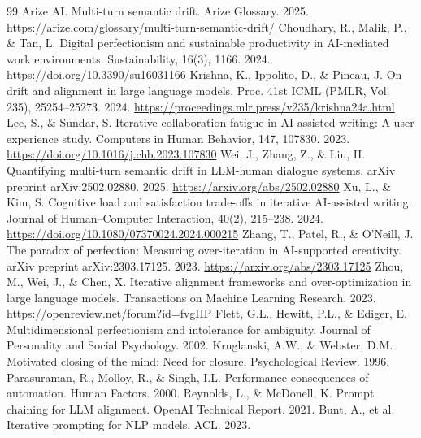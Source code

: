 \documentclass[conference]{IEEEtran} %
\begin{document}
\begin{thebibliography}{99}
 Arize AI. Multi-turn semantic drift. Arize Glossary. 2025. \url{https://arize.com/glossary/multi-turn-semantic-drift/}
 Choudhary, R., Malik, P., \& Tan, L. Digital perfectionism and sustainable productivity in AI-mediated work environments. Sustainability, 16(3), 1166. 2024. \url{https://doi.org/10.3390/su16031166}
 Krishna, K., Ippolito, D., \& Pineau, J. On drift and alignment in large language models. Proc. 41st ICML (PMLR, Vol. 235), 25254–25273. 2024. \url{https://proceedings.mlr.press/v235/krishna24a.html}
 Lee, S., \& Sundar, S. Iterative collaboration fatigue in AI-assisted writing: A user experience study. Computers in Human Behavior, 147, 107830. 2023. \url{https://doi.org/10.1016/j.chb.2023.107830}
 Wei, J., Zhang, Z., \& Liu, H. Quantifying multi-turn semantic drift in LLM-human dialogue systems. arXiv preprint arXiv:2502.02880. 2025. \url{https://arxiv.org/abs/2502.02880}
 Xu, L., \& Kim, S. Cognitive load and satisfaction trade-offs in iterative AI-assisted writing. Journal of Human–Computer Interaction, 40(2), 215–238. 2024. \url{https://doi.org/10.1080/07370024.2024.000215}
 Zhang, T., Patel, R., \& O’Neill, J. The paradox of perfection: Measuring over-iteration in AI-supported creativity. arXiv preprint arXiv:2303.17125. 2023. \url{https://arxiv.org/abs/2303.17125}
 Zhou, M., Wei, J., \& Chen, X. Iterative alignment frameworks and over-optimization in large language models. Transactions on Machine Learning Research. 2023. \url{https://openreview.net/forum?id=fvgIIP}
 Flett, G.L., Hewitt, P.L., \& Ediger, E. Multidimensional perfectionism and intolerance for ambiguity. Journal of Personality and Social Psychology. 2002.
 Kruglanski, A.W., \& Webster, D.M. Motivated closing of the mind: Need for closure. Psychological Review. 1996.
 Parasuraman, R., Molloy, R., \& Singh, I.L. Performance consequences of automation. Human Factors. 2000.
 Reynolds, L., \& McDonell, K. Prompt chaining for LLM alignment. OpenAI Technical Report. 2021.
 Bunt, A., et al. Iterative prompting for NLP models. ACL. 2023.
\end{thebibliography}
\end{document}

